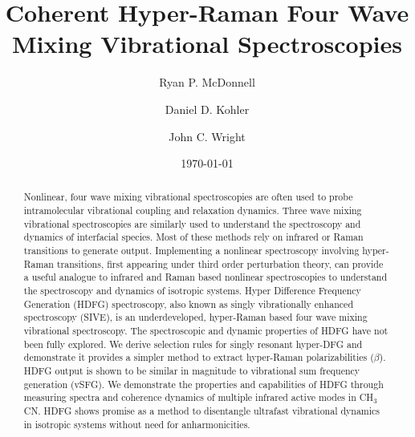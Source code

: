 \documentclass[aip, jcp, reprint, onecolumn]{revtex4-2}
\begin{document}
\title{Coherent Hyper-Raman Four Wave Mixing Vibrational Spectroscopies}


\author{Ryan P. McDonnell} 
\author{Daniel D. Kohler}
\author{John C. Wright} 


\date{\today}

\begin{abstract}
Nonlinear, four wave mixing vibrational spectroscopies are often used to probe intramolecular vibrational coupling and relaxation dynamics.
Three wave mixing vibrational spectroscopies are similarly used to understand the spectroscopy and dynamics of interfacial species.
Most of these methods rely on infrared or Raman transitions to generate output. 
Implementing a nonlinear spectroscopy involving hyper-Raman transitions, first appearing under third order perturbation theory, can provide a useful analogue to infrared and Raman based nonlinear spectroscopies to understand the spectroscopy and dynamics of isotropic systems.
Hyper Difference Frequency Generation (HDFG) spectroscopy, also known as singly vibrationally enhanced spectroscopy (SIVE), is an underdeveloped, hyper-Raman based four wave mixing vibrational spectroscopy. 
The spectroscopic and dynamic properties of HDFG have not been fully explored.
We derive selection rules for singly resonant hyper-DFG and demonstrate it provides a simpler method to extract hyper-Raman polarizabilities ($\beta$).
HDFG output is shown to be similar in magnitude to vibrational sum frequency generation (vSFG). 
We demonstrate the properties and capabilities of HDFG through measuring spectra and coherence dynamics of multiple infrared active modes in CH$_3$CN.
HDFG shows promise as a method to disentangle ultrafast vibrational dynamics in isotropic systems without need for anharmonicities.

\end{abstract}

\maketitle
\end{document}
